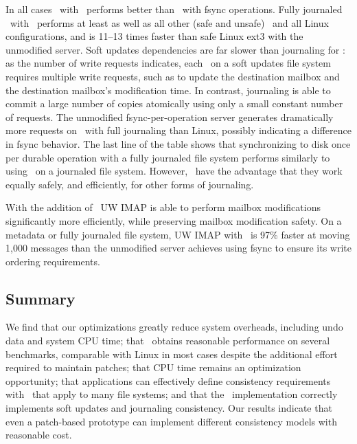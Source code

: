 In all cases \Kudos\ with \patchgroups\ performs better than \Kudos\ with
fsync operations.
%
Fully journaled \Kudos\ with \patchgroups\ performs at least as well
as all other (safe and unsafe) \Kudos\ and all Linux configurations, and is
11--13 times faster than safe Linux ext3 with the unmodified
server.
%
Soft updates dependencies are far slower than journaling for \patchgroups:
as the number of write requests
indicates, each \patchgroup\ on a soft updates file system requires
multiple write requests, such as to update the destination mailbox and
the destination mailbox's modification time. In contrast, journaling
is able to commit a large number of copies atomically using only a
small constant number of requests.
%
The unmodified fsync-per-operation server generates dramatically more
requests on \Kudos\ with full journaling than Linux, possibly indicating a
difference in fsync behavior.
%
The last line of the table shows that synchronizing to disk once per
durable operation with a fully journaled file system performs similarly to
using \patchgroups\ on a journaled file system. However, \patchgroups\
have the advantage that they work equally safely, and efficiently, for
other forms of journaling.



\imaptable{}

With the addition of \patchgroups\ UW IMAP is able to perform mailbox
modifications significantly more efficiently, while preserving mailbox
modification safety. On a metadata or fully journaled file system, UW
IMAP with \patchgroups\ is 97\% faster at moving 1,000 messages than
the unmodified server achieves using fsync to ensure its write
ordering requirements.


\subsection{Summary}
\label{sec:evaluation:summary}

We find
%
that our optimizations greatly reduce system overheads, including
undo data and system CPU time;
%
that \Kudos\ obtains reasonable performance on several benchmarks,
comparable with Linux in most cases despite the additional effort required
to maintain patches;
%
that CPU time remains an optimization opportunity;
%
that applications can effectively define consistency requirements with
\patchgroups\ that apply to many file systems;
%
and that the \Kudos\ implementation correctly
implements soft updates and journaling consistency.
%
Our results indicate that even a patch-based prototype
can implement different consistency models with reasonable cost.
